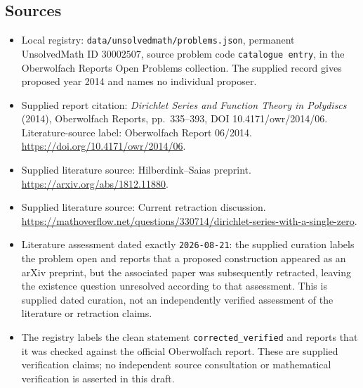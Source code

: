 \documentclass[11pt]{article}
\begin{document}
\subsection{Sources}
\begin{itemize}
\item Local registry: \texttt{data/unsolvedmath/problems.json}, permanent UnsolvedMath ID \(30002507\), source problem code \texttt{catalogue entry}, in the Oberwolfach Reports Open Problems collection. The supplied record gives proposed year 2014 and names no individual proposer.
\item Supplied report citation: \emph{Dirichlet Series and Function Theory in Polydiscs} (2014), Oberwolfach Reports, pp.~335--393, DOI 10.4171/owr/2014/06. Literature-source label: Oberwolfach Report 06/2014. \url{https://doi.org/10.4171/owr/2014/06}.
\item Supplied literature source: Hilberdink--Saias preprint. \url{https://arxiv.org/abs/1812.11880}.
\item Supplied literature source: Current retraction discussion. \url{https://mathoverflow.net/questions/330714/dirichlet-series-with-a-single-zero}.
\item Literature assessment dated exactly \texttt{2026-08-21}: the supplied curation labels the problem open and reports that a proposed construction appeared as an arXiv preprint, but the associated paper was subsequently retracted, leaving the existence question unresolved according to that assessment. This is supplied dated curation, not an independently verified assessment of the literature or retraction claims.
\item The registry labels the clean statement \texttt{corrected\_verified} and reports that it was checked against the official Oberwolfach report. These are supplied verification claims; no independent source consultation or mathematical verification is asserted in this draft.
\end{itemize}
\end{document}
